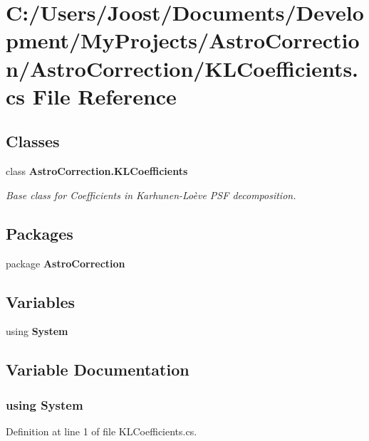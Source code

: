 \section{C:/Users/Joost/Documents/Development/MyProjects/AstroCorrection/AstroCorrection/KLCoefficients.cs File Reference}
\label{_k_l_coefficients_8cs}
\subsection*{Classes}
\begin{DoxyCompactItemize}
\item 
class {\bf AstroCorrection.KLCoefficients}
\begin{DoxyCompactList}\small\item\em Base class for Coefficients in Karhunen-\/Loève PSF decomposition. \item\end{DoxyCompactList}\end{DoxyCompactItemize}
\subsection*{Packages}
\begin{DoxyCompactItemize}
\item 
package {\bf AstroCorrection}
\end{DoxyCompactItemize}
\subsection*{Variables}
\begin{DoxyCompactItemize}
\item 
﻿using {\bf System}
\end{DoxyCompactItemize}


\subsection{Variable Documentation}
\subsubsection[{System}]{\setlength{\rightskip}{0pt plus 5cm}﻿using {\bf System}}\label{_k_l_coefficients_8cs_a81a223a02c34d82b47199f08308847f2}


Definition at line 1 of file KLCoefficients.cs.